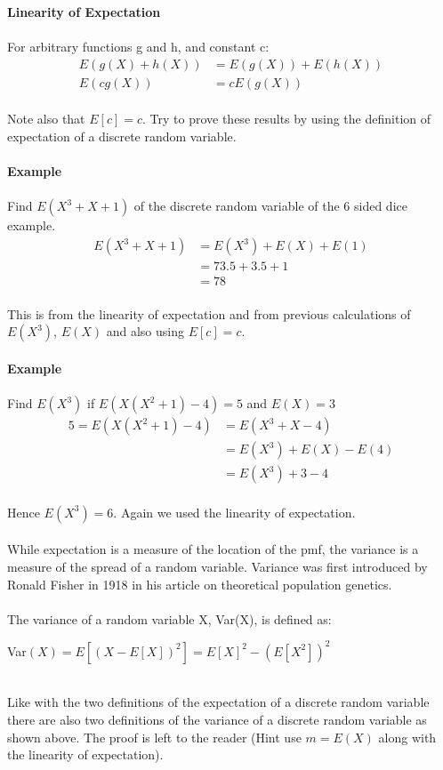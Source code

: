 \documentclass[,oneside]{article}
\begin{document}
\begin{enumerate}
\textbf{Linearity of Expectation}\\ \\
For arbitrary functions g and h, and constant c:\\
\begin{align*}
E(g(X)+h(X)) &= E(g(X))+E(h(X))\\
E(cg(X)) &= cE(g(X))
\end{align*}\\
Note also that $E[c]=c$. Try to prove these results by using the definition of expectation of a discrete random variable.\\ \\
\textbf{Example}\\ \\
Find $E(X^3+X+1)$ of the discrete random variable of the 6 sided dice example.
\begin{align*}
E(X^3+X+1) &= E(X^3)+E(X)+E(1)\\
&= 73.5 + 3.5 + 1\\
&= 78
\end{align*}\\
This is from the linearity of expectation and from previous calculations of $E(X^3)$, $E(X)$ and also using $E[c]=c$.\\ \\
\textbf{Example}\\ \\
Find $E(X^3)$ if $E(X(X^2+1)-4) = 5$ and $E(X)=3$\\
\begin{align*}
5 = E(X(X^2+1)-4) &= E(X^3+X-4)\\
&= E(X^3)+E(X)-E(4)\\
&= E(X^3)+3-4
\end{align*}\\
Hence $E(X^3)=6$. Again we used the linearity of expectation. \\ \\
While expectation is a measure of the location of the pmf, the variance is a measure of the spread of a random variable. Variance was first introduced by Ronald Fisher in 1918 in his article on theoretical population genetics.\\ \\
The variance of a random variable X, Var(X), is defined as:
\begin{center}
Var$(X) = E[(X-E[X])^2] = E[X]^2-(E[X^2])^2$
\end{center}\\
Like with the two definitions of the expectation of a discrete random variable there are also two definitions of the variance of a discrete random variable as shown above. The proof is left to the reader (Hint use $m = E(X)$ along with the linearity of expectation).\\ \\

\end{enumerate}
\end{document}

